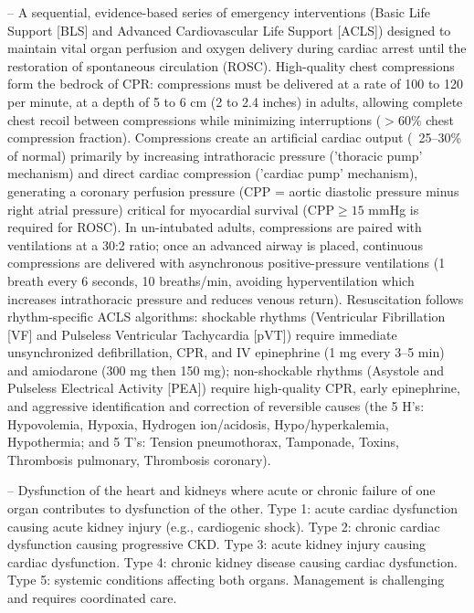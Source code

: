 -- A sequential, evidence-based series of emergency interventions (Basic Life Support [BLS] and Advanced Cardiovascular Life Support [ACLS]) designed to maintain vital organ perfusion and oxygen delivery during cardiac arrest until the restoration of spontaneous circulation (ROSC). High-quality chest compressions form the bedrock of CPR: compressions must be delivered at a rate of 100 to 120 per minute, at a depth of 5 to 6 cm (2 to 2.4 inches) in adults, allowing complete chest recoil between compressions while minimizing interruptions ($>60\%$ chest compression fraction). Compressions create an artificial cardiac output (~25--30\% of normal) primarily by increasing intrathoracic pressure ('thoracic pump' mechanism) and direct cardiac compression ('cardiac pump' mechanism), generating a coronary perfusion pressure (CPP = aortic diastolic pressure minus right atrial pressure) critical for myocardial survival ($\text{CPP} \ge 15$ mmHg is required for ROSC). In un-intubated adults, compressions are paired with ventilations at a 30:2 ratio; once an advanced airway is placed, continuous compressions are delivered with asynchronous positive-pressure ventilations (1 breath every 6 seconds, 10 breaths/min, avoiding hyperventilation which increases intrathoracic pressure and reduces venous return). Resuscitation follows rhythm-specific ACLS algorithms: shockable rhythms (Ventricular Fibrillation [VF] and Pulseless Ventricular Tachycardia [pVT]) require immediate unsynchronized defibrillation, CPR, and IV epinephrine (1 mg every 3--5 min) and amiodarone (300 mg then 150 mg); non-shockable rhythms (Asystole and Pulseless Electrical Activity [PEA]) require high-quality CPR, early epinephrine, and aggressive identification and correction of reversible causes (the 5 H's: Hypovolemia, Hypoxia, Hydrogen ion/acidosis, Hypo/hyperkalemia, Hypothermia; and 5 T's: Tension pneumothorax, Tamponade, Toxins, Thrombosis pulmonary, Thrombosis coronary).

-- Dysfunction of the heart and kidneys where acute or chronic failure of one organ contributes to dysfunction of the other. Type 1: acute cardiac dysfunction causing acute kidney injury (e.g., cardiogenic shock). Type 2: chronic cardiac dysfunction causing progressive CKD. Type 3: acute kidney injury causing cardiac dysfunction. Type 4: chronic kidney disease causing cardiac dysfunction. Type 5: systemic conditions affecting both organs. Management is challenging and requires coordinated care.

